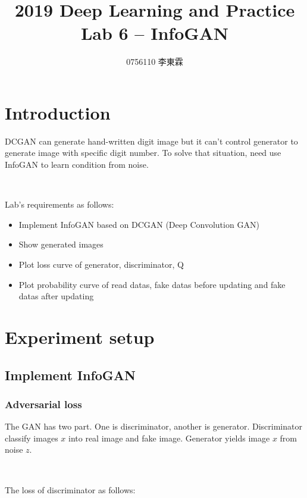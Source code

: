 \documentclass[12pt]{article}
\begin{document}
 
 
\title{2019 Deep Learning and Practice \\ Lab 6 -- InfoGAN}
\author{0756110 李東霖}

\maketitle
\section{Introduction}

DCGAN can generate hand-written digit image but it can't control generator to generate image with specific digit number. To solve that situation, need use InfoGAN to learn condition from noise.
\par \  \par
Lab's requirements as follows:

\begin{itemize}
\item Implement InfoGAN based on DCGAN (Deep Convolution GAN)
\item Show generated images
\item Plot loss curve of generator, discriminator, Q
\item Plot probability curve of read datas, fake datas before updating and fake datas after updating
\end{itemize}


\section{Experiment setup}

\subsection{Implement InfoGAN}

\subsubsection{Adversarial loss}

The GAN has two part. One is discriminator, another is generator. Discriminator classify images $x$ into real image and fake image. Generator yields image $x$ from noise $z$. 

\par \ \par
The loss of discriminator as follows:
\end{document}
